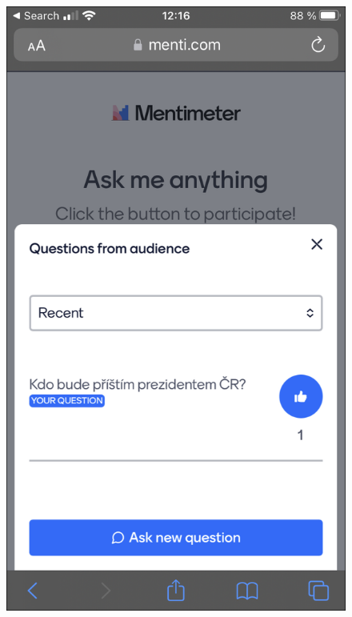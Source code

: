 \begin{figure}
\centering
\begin{minipage}{.5\textwidth}
  \centering
  \includegraphics[width=.7\linewidth]{obrazky/mentimeter_client.png}
  \label{fig:sub5}
\end{minipage}%
\begin{minipage}{.5\textwidth}
  \centering

\end{minipage}
\end{figure}
